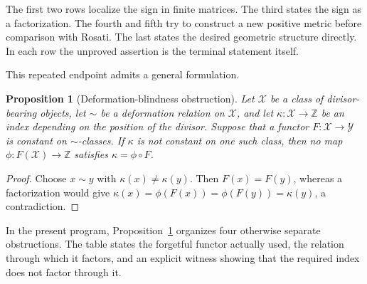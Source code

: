 \documentclass[11pt]{amsart}
\newtheorem{proposition}[theorem]{Proposition}
\theoremstyle{definition}
\theoremstyle{remark}
\begin{document}
The first two rows localize the sign in finite matrices.  The third states
the sign as a factorization.  The fourth and fifth try to construct a new
positive metric before comparison with Rosati.  The last states the desired
geometric structure directly.  In each row the unproved
assertion is the terminal statement itself.

This repeated endpoint admits a general formulation.

\begin{proposition}[Deformation-blindness obstruction]
\label{prop:deformation-blindness}
Let \(\mathcal X\) be a class of divisor-bearing objects, let \(\sim\) be a
deformation relation on \(\mathcal X\), and let
\(\kappa:\mathcal X\to\mathbb Z\) be an index depending on the position of
the divisor.  Suppose that a functor \(F:\mathcal X\to\mathcal Y\) is
constant on \(\sim\)-classes.  If \(\kappa\) is not constant on one such
class, then no map \(\phi:F(\mathcal X)\to\mathbb Z\) satisfies
\(\kappa=\phi\circ F\).
\end{proposition}

\begin{proof}
Choose \(x\sim y\) with \(\kappa(x)\ne\kappa(y)\).  Then
\(F(x)=F(y)\), whereas a factorization would give
\(\kappa(x)=\phi(F(x))=\phi(F(y))=\kappa(y)\), a contradiction.
\end{proof}

In the present program, Proposition~\ref{prop:deformation-blindness}
organizes four otherwise separate obstructions.  The table states the
forgetful functor actually used, the relation through which it factors,
and an explicit witness showing that the required index does not factor
through it.
\end{document}
